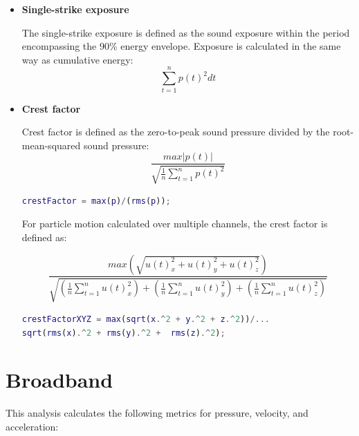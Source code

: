 \documentclass[11pt]{report}
\begin{document}
\begin{itemize}
\item \textbf{Single-strike exposure}

The single-strike exposure is defined as the sound exposure within the period encompassing the 90\% energy envelope.  Exposure is calculated in the same way as cumulative energy:\\

$$ \sum_{t = 1}^{n}p(t)^2 dt $$

\item \textbf{Crest factor}

Crest factor is defined as the zero-to-peak sound pressure divided by the root-mean-squared sound pressure:\\

$$ \frac{\mathit{max}|\mathit{p(t)}|}{\sqrt{\frac{1}{n} \sum_{t = 1}^{n}p(t)^2}} $$

\begin{lstlisting}[style=github, language=MATLAB]
crestFactor = max(p)/(rms(p));
\end{lstlisting}

For particle motion calculated over multiple channels, the crest factor is defined as:

$$ \frac{\mathit{max}\left( \sqrt{u(t)_x^2 + u(t)_y^2 + u(t)_z^2} \right)}{\sqrt{\left(\frac{1}{n} \sum_{t = 1}^{n}u(t)^2_x \right) + \left(\frac{1}{n} \sum_{t = 1}^{n}u(t)^2_y \right) + \left(\frac{1}{n} \sum_{t = 1}^{n}u(t)^2_z \right)}} $$

\begin{lstlisting}[style=github, language=MATLAB]
crestFactorXYZ = max(sqrt(x.^2 + y.^2 + z.^2))/...
sqrt(rms(x).^2 + rms(y).^2 +  rms(z).^2);
\end{lstlisting}

\end{itemize}
\section{Broadband}

This analysis calculates the following metrics for pressure, velocity, and acceleration:
\end{document}
